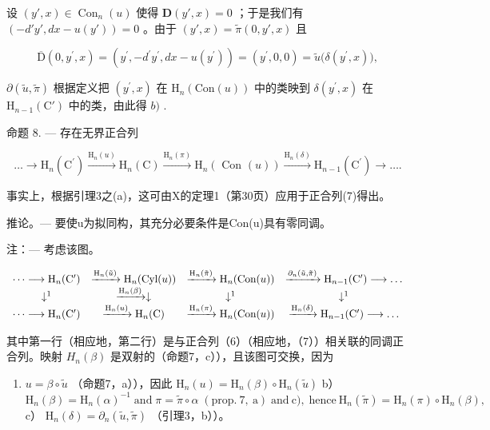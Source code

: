 设 \((y', x) \in \operatorname{Con}_n(u)\) 使得 \(\mathbf{D}(y', x) = 0\) ；于是我们有 \((-d'y', dx - u(y')) = 0\) 。由于 \((y', x) = \tilde{\pi}(0, y', x)\) 且

\[
\overline {{{\mathrm{D}}}} (0, y ^ {\prime}, x) = \left(y ^ {\prime}, - d ^ {\prime} y ^ {\prime}, d x - u (y ^ {\prime})\right) = \left(y ^ {\prime}, 0, 0\right) = \tilde {u} \big (\delta (y ^ {\prime}, x) \big),
\]

\(\partial (\tilde{u},\tilde{\pi})\) 根据定义把 \((y^{\prime},x)\) 在 \(\mathrm{H}_n(\mathrm{Con}(u))\) 中的类映到 \(\delta (y^{\prime},x)\) 在 \(\mathrm{H}_{n - 1}(\mathrm{C}')\) 中的类，由此得 \(b)\) .

命题 8. --- 存在无界正合列

\[
\dots \longrightarrow \mathrm{H} _ {n} (\mathrm{C} ^ {\prime}) \xrightarrow {\mathrm{H} _ {n} (u)} \mathrm{H} _ {n} (\mathrm{C}) \xrightarrow {\mathrm{H} _ {n} (\pi)} \mathrm{H} _ {n} (\text { Con } (u)) \xrightarrow {\mathrm{H} _ {n} (\delta)} \mathrm{H} _ {n - 1} (\mathrm{C} ^ {\prime}) \longrightarrow \dots .\tag{8}
\]

事实上，根据引理3之(a)，这可由X的定理1（第30页）应用于正合列(7)得出。

推论。--- 要使u为拟同构，其充分必要条件是Con(u)具有零同调。

注：--- 考虑该图。

\[
\begin{array}{c c c c c} \dots \longrightarrow \mathrm{H} _ {n} (\mathrm{C} ^ {\prime}) & \xrightarrow {\mathrm{H} _ {n} (\tilde {u})} \mathrm{H} _ {n} (\text {Cyl} (u)) & \xrightarrow {\mathrm{H} _ {n} (\tilde {\pi})} \mathrm{H} _ {n} (\text {Con} (u)) & \xrightarrow {\partial_ {n} (\tilde {u} , \tilde {\pi})} \mathrm{H} _ {n - 1} (\mathrm{C} ^ {\prime}) \longrightarrow \dots \\ \downarrow^ {1} & \xrightarrow {\mathrm{H} _ {n} (\beta)} \downarrow & \downarrow^ {1} & \downarrow^ {1} \\ \dots \longrightarrow \mathrm{H} _ {n} (\mathrm{C} ^ {\prime}) & \xrightarrow {\mathrm{H} _ {n} (u)} \mathrm{H} _ {n} (\mathrm{C}) & \xrightarrow {\mathrm{H} _ {n} (\pi)} \mathrm{H} _ {n} (\text {Con} (u)) & \xrightarrow {\mathrm{H} _ {n} (\delta)} \mathrm{H} _ {n - 1} (\mathrm{C} ^ {\prime}) \longrightarrow \dots \end{array}
\]

其中第一行（相应地，第二行）是与正合列（6）（相应地，（7））相关联的同调正合列。映射 \(H_{n}(\beta)\) 是双射的（命题7，c）），且该图可交换，因为

\begin{enumerate}
\def\labelenumi{\alph{enumi})}
\tightlist
\item
  \(u = \beta \circ \tilde{u}\) （命题7，a）），因此 \(\mathrm{H}_n(u) = \mathrm{H}_n(\beta) \circ \mathrm{H}_n(\tilde{u})\) b） \(\mathrm{H}_{n}(\beta)=\mathrm{H}_{n}(\alpha)^{-1}\;\mathrm{and}\;\pi=\tilde{\pi}\circ\alpha\;(\mathrm{prop.~7,~a})\;\mathrm{and~c}),\;\mathrm{hence~}\mathrm{H}_{n}(\tilde{\pi})=\mathrm{H}_{n}(\pi)\circ\mathrm{H}_{n}(\beta),\) c） \(\mathrm{H}_{n}(\delta)=\partial_{n}(\tilde{u},\tilde{\pi})\) （引理3，b））。
\end{enumerate}


